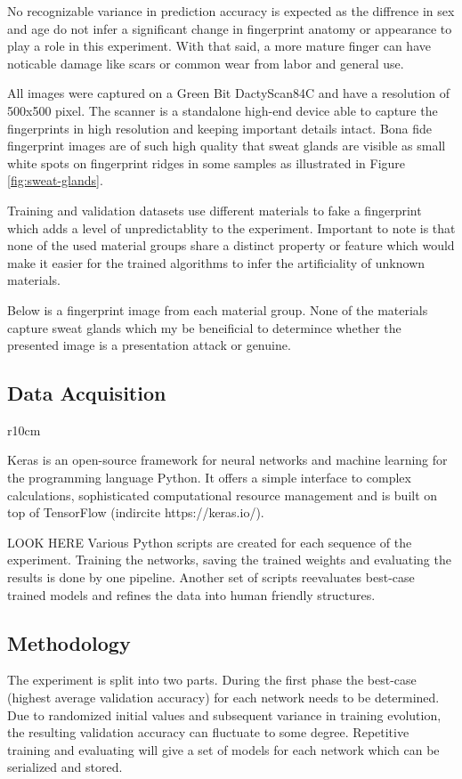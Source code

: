 No recognizable variance in prediction accuracy is expected as the diffrence in sex and age do not infer a significant change in fingerprint anatomy or appearance to play a role in this experiment.
With that said, a more mature finger can have noticable damage like scars or common wear from labor and general use.

All images were captured on a Green Bit DactyScan84C and have a resolution of 500x500 pixel.
The scanner is a standalone high-end device able to capture the fingerprints in high resolution and keeping important details intact.
Bona fide fingerprint images are of such high quality that sweat glands are visible as small white spots on fingerprint ridges in some samples as illustrated in Figure \ref{fig:sweat-glands}.

Training and validation datasets use different materials to fake a fingerprint which adds a level of unpredictablity to the experiment.
Important to note is that none of the used material groups share a distinct property or feature which would make it easier for the trained algorithms to infer the artificiality of unknown materials.

Below is a fingerprint image from each material group.
None of the materials capture sweat glands which my be beneificial to determince whether the presented image is a presentation attack or genuine.






\subsection{Data Acquisition}
\begin{wrapfigure}[13]{r}{10cm}
    
\end{wrapfigure}
Keras is an open-source framework for neural networks and machine learning for the programming language Python.
It offers a simple interface to complex calculations, sophisticated computational resource management and is built on top of TensorFlow (indircite https://keras.io/).

LOOK  HERE Various Python scripts are created for each sequence of the experiment.
Training the networks, saving the trained weights and evaluating the results is done by one pipeline.
Another set of scripts reevaluates best-case trained models and refines the data into human friendly structures.



\subsection{Methodology}
The experiment is split into two parts.
During the first phase the best-case (highest average validation accuracy) for each network needs to be determined.
Due to randomized initial values and subsequent variance in training evolution, the resulting validation accuracy can fluctuate to some degree.
Repetitive training and evaluating will give a set of models for each network which can be serialized and stored.


